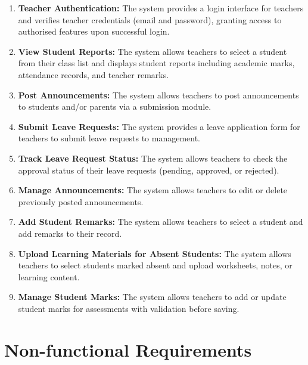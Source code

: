 \documentclass[12pt, a4paper]{report}
\begin{document}
\begin{enumerate}
    \item \textbf{Teacher Authentication:} The system provides a login interface for teachers and verifies teacher credentials (email and password), granting access to authorised features upon successful login.
    \item \textbf{View Student Reports:} The system allows teachers to select a student from their class list and displays student reports including academic marks, attendance records, and teacher remarks.
    \item \textbf{Post Announcements:} The system allows teachers to post announcements to students and/or parents via a submission module.
    \item \textbf{Submit Leave Requests:} The system provides a leave application form for teachers to submit leave requests to management.
    \item \textbf{Track Leave Request Status:} The system allows teachers to check the approval status of their leave requests (pending, approved, or rejected).
    \item \textbf{Manage Announcements:} The system allows teachers to edit or delete previously posted announcements.
    \item \textbf{Add Student Remarks:} The system allows teachers to select a student and add remarks to their record.
    \item \textbf{Upload Learning Materials for Absent Students:} The system allows teachers to select students marked absent and upload worksheets, notes, or learning content.
    \item \textbf{Manage Student Marks:} The system allows teachers to add or update student marks for assessments with validation before saving.
\end{enumerate}

\section{Non-functional Requirements}
\end{document}
